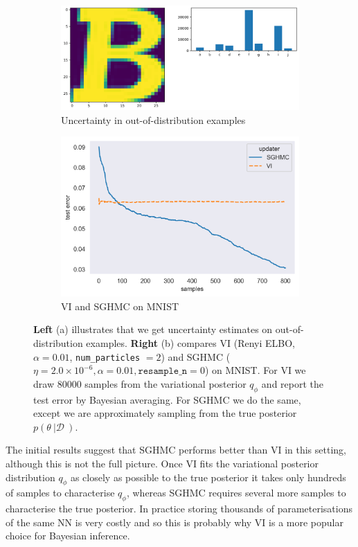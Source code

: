 \begin{figure}[h!]
\centering
\begin{subfigure}{.5\textwidth}
  \centering
  \includegraphics[width=.95\linewidth]{parts/Images/B.png}
  \caption{Uncertainty in out-of-distribution examples}
  \label{fig:B}
\end{subfigure}%
\begin{subfigure}{.5\textwidth}
  \centering
  \includegraphics[width=.95\linewidth]{parts/Images/VI_SGHMC.png}
  \caption{VI and SGHMC on MNIST}
  \label{fig:VI}
\end{subfigure}
\caption{{\bf Left} (a) illustrates that we get uncertainty estimates on out-of-distribution examples. {\bf Right} (b) compares VI (Renyi ELBO, $\alpha = 0.01$, \texttt{num\_particles} $= 2$) and SGHMC ($\eta = 2.0\times 10^{-6}, \alpha=0.01, \texttt{resample\_n} =0$) on MNIST. For VI we draw 80000 samples from the variational posterior $q_{\phi}$ and report the test error by Bayesian averaging. For SGHMC we do the same, except we are approximately sampling from the true posterior $p(\theta \: | \mathcal{D} \:)$.}
\label{fig:demo}
\end{figure}
The initial results suggest that SGHMC performs better than VI in this setting, although this is not the full picture. Once VI fits the variational posterior distribution $q_{\phi}$ as closely as possible to the true posterior it takes only hundreds of samples to characterise $q_{\phi}$, whereas SGHMC requires several more samples to characterise the true posterior. In practice storing thousands of parameterisations of the same NN is very costly and so this is probably why VI is a more popular choice for Bayesian inference. 

